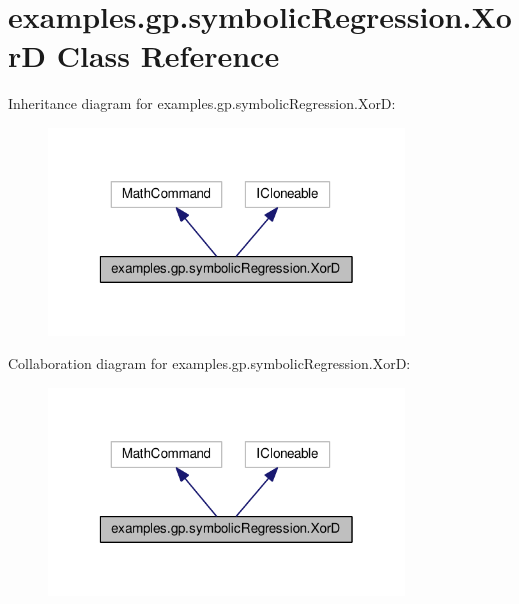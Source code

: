 \hypertarget{classexamples_1_1gp_1_1symbolic_regression_1_1_xor_d}{\section{examples.\-gp.\-symbolic\-Regression.\-Xor\-D Class Reference}
\label{classexamples_1_1gp_1_1symbolic_regression_1_1_xor_d}
}


Inheritance diagram for examples.\-gp.\-symbolic\-Regression.\-Xor\-D\-:
\nopagebreak
\begin{figure}[H]
\begin{center}
\leavevmode
\includegraphics[width=268pt]{classexamples_1_1gp_1_1symbolic_regression_1_1_xor_d__inherit__graph}
\end{center}
\end{figure}


Collaboration diagram for examples.\-gp.\-symbolic\-Regression.\-Xor\-D\-:
\nopagebreak
\begin{figure}[H]
\begin{center}
\leavevmode
\includegraphics[width=268pt]{classexamples_1_1gp_1_1symbolic_regression_1_1_xor_d__coll__graph}
\end{center}
\end{figure}
